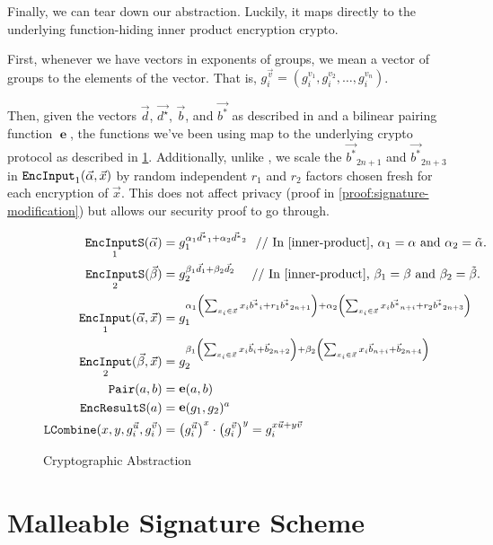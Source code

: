 \documentclass[pdftex,12pt,a4papaer,twoside,notitlepage]{report}
\DeclareMathOperator{\e}{\mathbf{e}}
\DeclareMathOperator{\ein}{\mathtt{EncInput}}
\DeclareMathOperator{\combine}{\mathtt{LCombine}}
\DeclareMathOperator{\eins}{\mathtt{EncInputS}}
\DeclareMathOperator{\eouts}{\mathtt{EncResultS}}
\DeclareMathOperator{\pair}{\mathtt{Pair}}
\begin{document}
Finally, we can tear down our abstraction. Luckily, it maps directly to the
underlying function-hiding inner product encryption crypto.

First, whenever we have vectors in exponents of groups, we mean a vector of
groups to the elements of the vector. That is, $g_i^{\vec{v}} = (g_i^{v_1},
g_i^{v_2}, \ldots, g_i^{v_n})$.

Then, given the vectors $\vec{d}$, $\vec{d^\star}$, $\vec{b}$, and $\vec{b^*}$
as described in \cite{inner-product} and a bilinear pairing function $\e$, the
functions we've been using map to the underlying crypto protocol as described in
\cref{fig:abstraction}. Additionally, unlike \cite{inner-product}, we scale the
$\vec{b^*}_{2n+1}$ and $\vec{b^*}_{2n+3}$ in $\ein_1(\Ap, \vec{x})$ by random
independent $r_1$ and $r_2$ factors chosen fresh for each encryption of
$\vec{x}$. This does not affect privacy (proof in
\cref{proof:signature-modification}) but allows our security proof to go
through.

\begin{figure}[H]
\label{fig:abstraction}
\begin{align*}
  \eins_1(\Ap) &= g_1^{\alpha_1\vec{d^*}_1 + \alpha_2\vec{d^*}_2} ~~\text{// In \cite{inner-product}, $\alpha_1 = \alpha$ and $\alpha_2 = \tilde{\alpha}$.} \\
  \eins_2(\Bp) &= g_2^{\beta_1\vec{d}_1 + \beta_2\vec{d}_2} ~~~~\text{// In \cite{inner-product}, $\beta_1 = \beta$ and $\beta_2 = \tilde{\beta}$.} \\
  \ein_1(\Ap, \vec{x}) &= g_1^{\alpha_1\left(\sum_{x_i \in \vec{x}}{x_i\vec{b^*}_i} + r_1\vec{b^*}_{2n+1}\right) + \alpha_2\left(\sum_{x_i \in \vec{x}}{x_i\vec{b^*}_{n+i}} + r_2\vec{b^*}_{2n+3}\right)} \\
  \ein_2(\Bp, \vec{x}) &= g_2^{\beta_1\left(\sum_{x_i \in \vec{x}}{x_i\vec{b}_i} + \vec{b}_{2n+2}\right) + \beta_2\left(\sum_{x_i \in \vec{x}}{x_i\vec{b}_{n+i}} + \vec{b}_{2n+4}\right)} \\
  \pair(a, b) &= \e(a, b) \\
  \eouts(a) &= \e(g_1, g_2)^a \\
  \combine(x, y, g_i^{\vec{u}}, g_i^{\vec{v}}) &= \left(g_i^{\vec{u}}\right)^x \cdot \left(g_i^{\vec{v}}\right)^y = g_i^{x\vec{u} + y\vec{v}}
\end{align*}
\caption{Cryptographic Abstraction}
\end{figure}

\section{Malleable Signature Scheme}
\label{sec:homo-sig}
\end{document}
